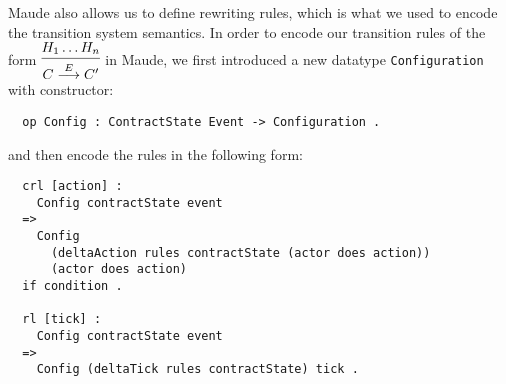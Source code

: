 \documentclass{article}
\begin{document}
Maude also allows us to define rewriting rules, which is what we used to encode
the transition system semantics.
In order to encode our transition rules of the form
$\begin{prooftree}
  \hypo{H_1 \dots H_n}
  \infer1{C \overset{E}{\longrightarrow} C'} \end{prooftree}$
in Maude, we first introduced a new datatype
\texttt{Configuration} with constructor:

\begin{lstlisting}
  op Config : ContractState Event -> Configuration .
\end{lstlisting}

and then encode the rules in the following form:
\begin{lstlisting}
  crl [action] :
    Config contractState event
  =>
    Config
      (deltaAction rules contractState (actor does action))
      (actor does action)
  if condition .

  rl [tick] :
    Config contractState event
  =>
    Config (deltaTick rules contractState) tick .
\end{lstlisting}



\end{document}
